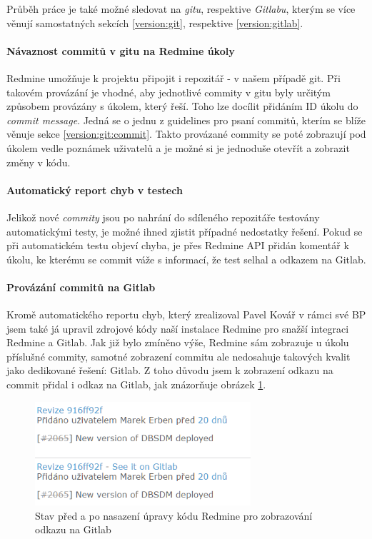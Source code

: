 Průběh práce je také možné sledovat na \emph{gitu}, respektive \emph{Gitlabu}, kterým se více věnují samostatných sekcích \ref{version:git}, respektive \ref{version:gitlab}.

\paragraph{Návaznost commitů v gitu na Redmine úkoly} \label{redmine:commitlink}
Redmine umožňuje k projektu připojit i repozitář - v našem případě git. Při takovém provázání je vhodné, aby jednotlivé commity v gitu byly určitým způsobem provázány s úkolem, který řeší. Toho lze docílit přidáním ID úkolu do \emph{commit message}. Jedná se o jednu z guidelines pro psaní commitů, kterím se blíže věnuje sekce \ref{version:git:commit}. Takto provázané commity se poté zobrazují pod úkolem vedle poznámek uživatelů a je možné si je jednoduše otevřít a zobrazit změny v kódu.

\paragraph{Automatický report chyb v testech} \label{redmine:CI_report}
Jelikož nové \emph{commity} jsou po nahrání do sdíleného repozitáře testovány automatickými testy, je možné ihned zjistit případné nedostatky řešení. Pokud se při automatickém testu objeví chyba, je přes Redmine API přidán komentář k úkolu, ke kterému se commit váže s informací, že test selhal a odkazem na Gitlab.

\paragraph{Provázání commitů na Gitlab}
Kromě automatického reportu chyb, který zrealizoval Pavel Kovář v rámci své BP jsem také já upravil zdrojové kódy naší instalace Redmine pro snažší integraci Redmine a Gitlab. Jak již bylo zmíněno výše, Redmine sám zobrazuje u úkolu příslušné commity, samotné zobrazení commitu ale nedosahuje takových kvalit jako dedikované řešení: Gitlab. Z toho důvodu jsem k zobrazení odkazu na commit přidal i odkaz na Gitlab, jak znázorňuje obrázek \ref{picture:redmineTOgitlab}.
\begin{figure}[h]
\includegraphics[width=8cm]{../png/redmineTOgitlab.png}
\caption{Stav před a po nasazení úpravy kódu Redmine pro zobrazování odkazu na Gitlab} \label{picture:redmineTOgitlab}
\end{figure}

